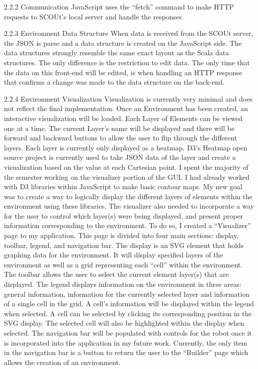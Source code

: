 2.2.2 Communication
JavaScript uses the “fetch” command to make HTTP requests to SCOUt’s local server and handle the responses.

2.2.3 Environment Data Structure
When data is received from the SCOUt server, the JSON is parse and a data structure is created on the JavaScript side.
The data structures strongly resemble the same exact layout as the Scala data structures.
The only difference is the restriction to edit data. The only time that the data on this front-end will be edited, is when handling an HTTP response that confirms a change was made to the data structure on the back-end.

2.2.4 Environment Visualization
Visualization is currently very minimal and does not reflect the final implementation.
Once an Environment has been created, an interactive visualization will be loaded.
Each Layer of Elements can be viewed one at a time.
The current Layer’s name will be displayed and there will be forward and backward buttons to allow the user to flip through the different layers.
Each layer is currently only displayed as a heatmap.
D3’s Heatmap open source project is currently used to take JSON data of the layer and create a visualization based on the value at each Cartesian point.
I spent the majority of the semester working on the visualizer portion of the GUI.
I had already worked with D3 libraries within JavaScript to make basic contour maps.
My new goal was to create a way to logically display the different layers of elements within the environment using these libraries.
The visualizer also needed to incorporate a way for the user to control which layer(s) were being displayed, and present proper information corresponding to the environment.
To do so, I created a “Visualizer” page to my application. This page is divided into four main sections: display, toolbar, legend, and navigation bar.
The display is an SVG element that holds graphing data for the environment.
It will display specified layers of the environment as well as a grid representing each “cell” within the environment.
The toolbar allows the user to select the current element layer(s) that are displayed.
The legend displays information on the environment in three areas: general information, information for the currently selected layer and information of a single cell in the grid.
A cell’s information will be displayed within the legend when selected.
A cell can be selected by clicking its corresponding position in the SVG display.
The selected cell will also be highlighted within the display when selected.
The navigation bar will be populated with controls for the robot once it is incorporated into the application in my future work.
Currently, the only item in the navigation bar is a button to return the user to the “Builder” page which allows the creation of an environment.


